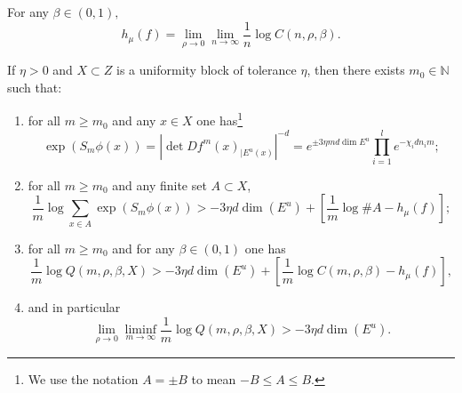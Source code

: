 \documentclass[10pt,a4paper]{amsart}
\begin{document}
\begin{thm}\label{thm:entr}
For any $\beta \in (0,1) ,$
$$  h_{\mu}(f) =      \lim_{\rho\to 0}    \lim_{n\to \infty}  \frac{1}{n} \log   C(n,\rho,\beta).$$
\end{thm}

\begin{lem}\label{lem:partsum}
If $\eta >0$ and $X\subset Z$ is a uniformity block of tolerance $\eta$, then there exists $m_0\in\mathbb{N}$ such that:
\begin{enumerate}
\item for all $m\geq m_0$ and any $x\in X$ one has\footnote{ We use the notation $A = \pm B$ to mean $  -B \leq  A  \leq B  $.} 
$$    \exp( S_m\phi (x)) =   | \det Df^m(x)_{| E^u(x)}  | ^{-d} =     e^{  \pm 3 \eta m d   \dim E^u}     \prod_{i=1}^{l}   e^{-\chi_i    d n_i   m };$$
\item for all $m\geq m_0$ and any finite set $A\subset X$,
$$  \frac{1}{m} \log  \sum_{x\in A}   \exp(S_m \phi (x)) > -3\eta d \dim(E^u) + \left[  \frac{1}{m} \log   \# A   - h_{\mu}(f)  \right] ; $$
\item for all $m\geq m_0$ and for any $\beta\in (0,1)$ one has
$$  \frac{1}{m} \log   Q(m,\rho,\beta, X) > -3\eta d \dim(E^u) + \left[  \frac{1}{m} \log   C(m,\rho,\beta)   - h_{\mu}(f)  \right] , $$
\item and in particular
$$  \lim_{\rho\to 0}   \liminf_{m\to \infty} \frac{1}{m} \log   Q(m,\rho,\beta, X) > -3\eta d \dim(E^u).$$
\end{enumerate}
\end{lem}
\end{document}
